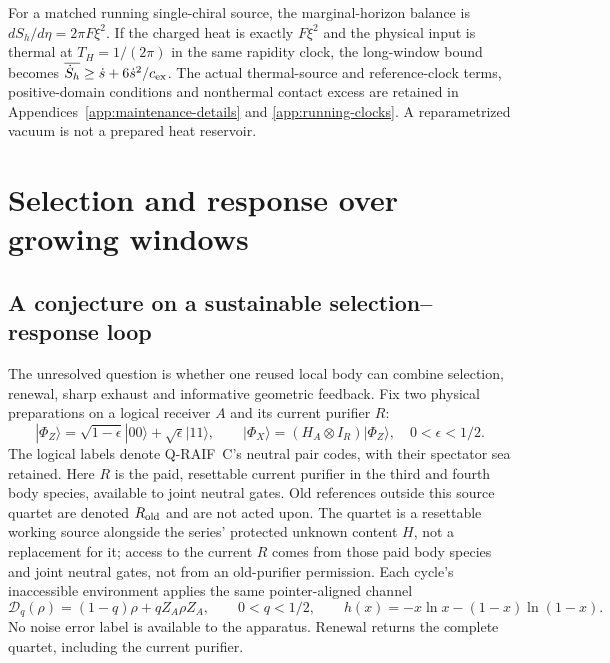 For a matched running single-chiral source, the marginal-horizon
balance is $dS_h/d\eta=2\pi F\xi^2$. If the charged heat is exactly
$F\xi^2$ and the physical input is thermal at $T_H=1/(2\pi)$ in the
same rapidity clock, the long-window bound becomes
$\overline{\dot S_h}\ge\dot s+6\dot s^2/c_{\rm ex}$.
The actual thermal-source and reference-clock terms, positive-domain
conditions and nonthermal contact excess are retained in
Appendices~\ref{app:maintenance-details} and \ref{app:running-clocks}.
A reparametrized vacuum is not a prepared heat reservoir.

\section{Selection and response over growing windows}

\subsection{A conjecture on a sustainable selection--response loop}

The unresolved question is whether one reused local body can combine
selection, renewal, sharp exhaust and informative geometric feedback.
Fix two physical preparations on a logical receiver $A$ and its current
purifier $R$:
\[
 |\Phi_Z\rangle=\sqrt{1-\epsilon}|00\rangle+
                   \sqrt\epsilon|11\rangle,\qquad
 |\Phi_X\rangle=(H_A\otimes I_R)|\Phi_Z\rangle,
 \quad 0<\epsilon<1/2.
\]
The logical labels denote Q-RAIF~C's neutral pair codes, with their
spectator sea retained. Here $R$ is the paid, resettable current purifier
in the third and fourth body species, available to joint neutral gates.
Old references outside this source quartet are denoted $R_{\rm old}$
and are not acted upon. The quartet is a resettable working source
alongside the series' protected unknown content $H$, not a replacement
for it; access to the current $R$ comes from those paid body species
and joint neutral gates, not from an old-purifier permission. Each cycle's inaccessible environment applies
the same pointer-aligned channel
\[
 \mathcal D_q(\rho)=(1-q)\rho+qZ_A\rho Z_A,
 \qquad 0<q<1/2,\qquad h(x)=-x\ln x-(1-x)\ln(1-x).
\]
No noise error label is available to the apparatus. Renewal returns the
complete quartet, including the current purifier.

